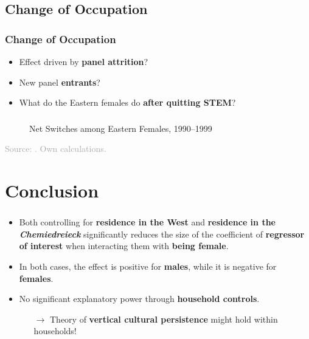 \documentclass[11pt, aspectratio=1610, xcolor={dvipsnames}]{beamer}
\newcommand{\highlight}[1]{\textbf{\textcolor{PineGreen}{#1}}}
\begin{document}
	\subsection{Change of Occupation}
	\begin{frame}
		\frametitle{Change of Occupation}
		
		\begin{itemize}
			\item Effect driven by \highlight{panel attrition}?
			\item New panel \highlight{entrants}?
			\item What do the Eastern females do \highlight{after quitting STEM}?
		\end{itemize}
		
	\end{frame}

	\begin{frame}
		\frametitle{}
		
		\begin{figure}[h]
			\centering
			\caption{Net Switches among Eastern Females, 1990--1999}
			\label{fig:eastern_female_tracking}
			\resizebox{75mm}{!}{}
		\end{figure}
		
		{\scriptsize
			\textcolor{darkgray}{Source: \cite{SOEP2023}. Own calculations.}
		}
		
	\end{frame}
		
	\section{Conclusion}	
	\begin{frame}
		\frametitle{}
		
		\begin{itemize}
			\item Both controlling for \highlight{residence in the West} and \highlight{residence in the \emph{Chemiedreieck}} significantly reduces the size of the coefficient of \highlight{regressor of interest} when interacting them with \highlight{being female}.
			\item In both cases, the effect is positive for \highlight{males}, while it is negative for \highlight{females}.
			\item No significant explanatory power through \highlight{household controls}.
			\begin{itemize}
				\item[$\rightarrow$] Theory of \highlight{vertical cultural persistence} might hold within households!
			\end{itemize}
		\end{itemize}
		
	\end{frame}
	
\end{document}
